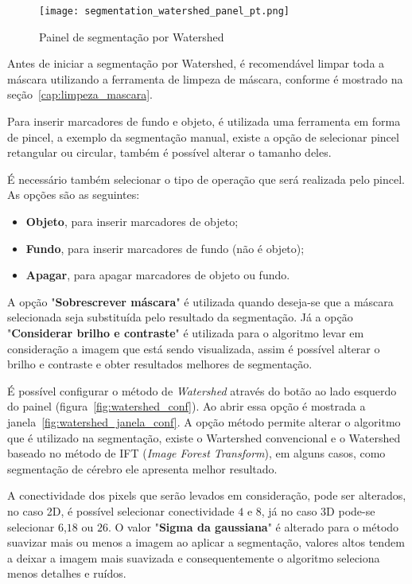 \begin{figure}[!htb]
\centering
\texttt{[image: segmentation\_watershed\_panel\_pt.png]}
\caption{Painel de segmentação por Watershed}
\label{fig:watershed_painel}
\end{figure}

Antes de iniciar a segmentação por Watershed, é recomendável limpar toda a máscara utilizando a ferramenta de limpeza de máscara, conforme é mostrado na seção~\ref{cap:limpeza_mascara}.

Para inserir marcadores de fundo e objeto, é utilizada uma ferramenta em forma de pincel, a exemplo da segmentação manual, existe a opção de selecionar pincel retangular ou circular, também é possível alterar o tamanho deles. 

É necessário também selecionar o tipo de operação que será realizada pelo pincel. As opções são as
seguintes:
\begin{itemize}
\item \textbf{Objeto}, para inserir marcadores de objeto;
\item \textbf{Fundo}, para inserir marcadores de fundo (não é objeto);
\item \textbf{Apagar}, para apagar marcadores de objeto ou fundo.
\end{itemize}

A opção "\textbf{Sobrescrever máscara}" é utilizada quando deseja-se que a máscara selecionada seja substituída pelo resultado da segmentação. Já a opção "\textbf{Considerar brilho e contraste}" é utilizada para o algoritmo levar em consideração a imagem que está sendo visualizada, assim é possível alterar o brilho e contraste e obter resultados melhores de segmentação.

É possível configurar o método de \textit{Watershed} através do botão ao lado esquerdo do painel (figura~\ref{fig:watershed_conf}). Ao abrir essa opção é mostrada a janela~\ref{fig:watershed_janela_conf}. A opção método permite alterar o algoritmo que é utilizado na segmentação, existe o Wartershed convencional e o Watershed baseado no método de IFT (\textit{Image Forest Transform}), em alguns casos, como segmentação de cérebro ele apresenta melhor resultado.

A conectividade dos pixels que serão levados em consideração, pode ser alterados, no caso 2D, é possível selecionar conectividade $4$ e $8$, já no caso 3D pode-se selecionar $6$,$18$ ou $26$. O valor "\textbf{Sigma da gaussiana}" é alterado para o método suavizar mais ou menos a imagem ao aplicar a segmentação, valores altos tendem a deixar a imagem mais suavizada e consequentemente o algoritmo seleciona menos detalhes e ruídos.

